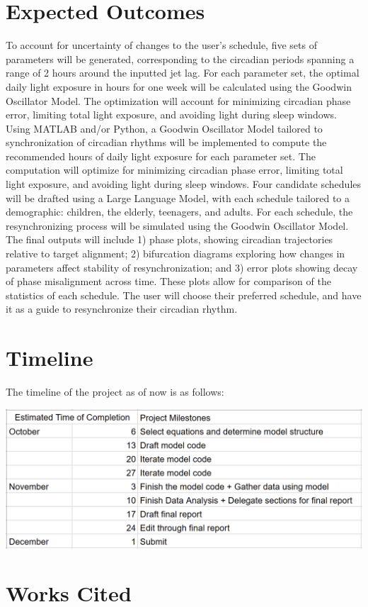 \documentclass{article}
\begin{document}
\section{Expected Outcomes}
\indent To account for uncertainty of changes to the user’s schedule, five sets of parameters will be generated, corresponding to the circadian periods spanning a range of 2 hours around the inputted jet lag. For each parameter set, the optimal daily light exposure in hours for one week will be calculated using the Goodwin Oscillator Model. The optimization will account for minimizing circadian phase error, limiting total light exposure, and avoiding light during sleep windows. 
Using MATLAB and/or Python, a Goodwin Oscillator Model tailored to synchronization of circadian rhythms will be implemented to compute the recommended hours of daily light exposure for each parameter set. The computation will optimize for minimizing circadian phase error, limiting total light exposure, and avoiding light during sleep windows. Four candidate schedules will be drafted using a Large Language Model, with each schedule tailored to a demographic: children, the elderly, teenagers, and adults. For each schedule, the resynchronizing process will be simulated using the Goodwin Oscillator Model. The final outputs will include 1) phase plots, showing circadian trajectories relative to target alignment; 2) bifurcation diagrams exploring how changes in parameters affect stability of resynchronization; and 3) error plots showing decay of phase misalignment across time. These plots allow for comparison of the statistics of each schedule. The user will choose their preferred schedule, and have it as a guide to resynchronize their circadian rhythm.

\section{Timeline}
\indent The timeline of the project as of now is as follows:


\includegraphics[scale=0.4]{timeline.png}

\section{Works Cited}
\printbibliography
\end{document}
